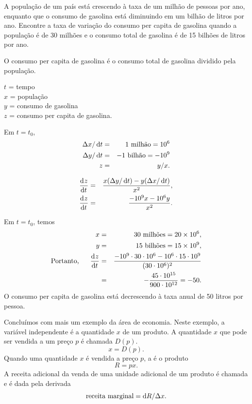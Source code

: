 \begin{example}
  A população de um país está crescendo à taxa de um milhão de pessoas
  por ano, enquanto que o consumo de gasolina está diminuindo em um
  bilhão de litros por ano. Encontre a taxa de variação do consumo
  per capita de gasolina quando a população é de 30 milhões e o consumo
  total de gasolina é de 15 bilhões de litros por ano.

  O consumo per capita de gasolina é o consumo total de gasolina dividido
  pela população.
\begin{stepanalysis}
  \item $t$ = tempo\\
        $x$ = população\\
        $y$ = consumo de gasolina\\
        $z$ = consumo per capita de gasolina.
  \item Em $t = t_0$,
  \begin{eqnarray*}
    \dx/\dt & = & 1 \text{ milhão} = 10^6 \\
    \dy/\dt & = & -1 \text{ bilhão} = -10^9 \\
          z & = & y/x.
  \end{eqnarray*}
  \item
  \begin{eqnarray*}
    \dod z t & = & \frac{x(\dy/\dt)-y(\dx/\dt)}{x^2}, \\
    \dod z t & = & \frac{-10^9x - 10^6y}{x^2}.
  \end{eqnarray*}
  \item Em $t = t_0$, temos
  \begin{eqnarray*}
    x & = & 30 \text{ milhões} = 20 \times 10^6, \\
    y & = & 15 \text{ bilhões} = 15 \times 10^9, \\
    \text{Portanto,} \hspace{1.5em} \dod z t & = &
      \frac{-10^9 \cdot 30 \cdot 10^6 - 10^6 \cdot 15 \cdot 10^9}%
           {(30 \cdot 10^6)^2} \\
    & = & -\frac{45 \cdot 10^{15}}{900 \cdot 10^{12}} = -50.
  \end{eqnarray*}
  O consumo per capita de gasolina está decrescendo à taxa anual de 50
  litros por pessoa.
\end{stepanalysis}
\end{example}

Concluímos com mais um exemplo da área de economia. Neste exemplo,
a variável independente é a quantidade $x$ de um produto. A quantidade
$x$ que pode ser vendida a um preço $p$ é chamada 
$D(p)$.
$$
  x = D(p).
$$
Quando uma quantidade $x$ é vendida a preço $p$, a  é o
produto
$$
  R = px.
$$
A receita adicional da venda de uma unidade adicional de um produto é
chamada  e é dada pela derivada
$$
  \text{receita marginal} = \dif R/\dx.
$$

